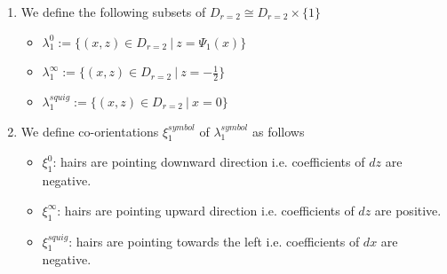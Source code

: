 \begin{definition}
\begin{enumerate}
\item We define the following subsets of $D_{r=2} \cong D_{r=2}\times \{1\}$
\begin{itemize}
\item $\lambda_1^0 := \{(x,z) \in D_{r=2} ~|~ z = \Psi_1(x)\}$

\item $\lambda_1^\infty:= \{(x,z) \in D_{r=2} ~|~ z = -\frac{1}{2}\}$ 

\item $\lambda_1^{squig}:= \{(x,z) \in D_{r=2} ~|~ x = 0\}$ 
\end{itemize}

\item We define co-orientations $\xi_1^{symbol}$ of $\lambda_1^{symbol}$ as follows
\begin{itemize}
\item $\xi_1^0$: hairs are pointing downward direction i.e. coefficients of $dz$ are negative.

\item $\xi_1^\infty$: hairs are pointing upward direction i.e. coefficients of $dz$ are positive.

\item $\xi_1^{squig}$: hairs are pointing towards the left i.e. coefficients of $dx$ are negative.
\end{itemize}
\end{enumerate}
\end{definition}

